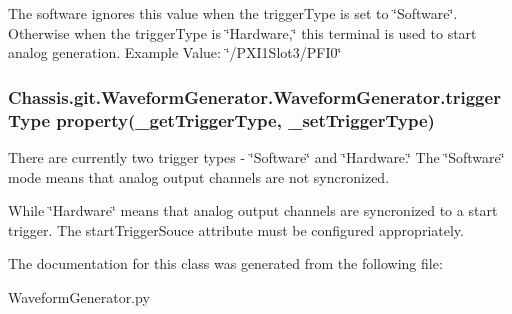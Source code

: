 The software ignores this value when the trigger\-Type is set to \char`\"{}\-Software\char`\"{}. Otherwise when the trigger\-Type is \char`\"{}\-Hardware,\char`\"{} this terminal is used to start analog generation. Example Value\-: \char`\"{}/\-P\-X\-I1\-Slot3/\-P\-F\-I0\char`\"{} \hypertarget{class_chassis_8git_1_1_waveform_generator_1_1_waveform_generator_a16967bab9c78a174def6dca01776065f}{
\subsubsection[{trigger\-Type}]{\setlength{\rightskip}{0pt plus 5cm}Chassis.\-git.\-Waveform\-Generator.\-Waveform\-Generator.\-trigger\-Type property(\-\_\-get\-Trigger\-Type, \-\_\-set\-Trigger\-Type)\hspace{0.3cm}{\ttfamily [static]}}}\label{class_chassis_8git_1_1_waveform_generator_1_1_waveform_generator_a16967bab9c78a174def6dca01776065f}


There are currently two trigger types -\/ \char`\"{}\-Software\char`\"{} and \char`\"{}\-Hardware.\char`\"{} The \char`\"{}\-Software\char`\"{} mode means that analog output channels are not syncronized. 

While \char`\"{}\-Hardware\char`\"{} means that analog output channels are syncronized to a start trigger. The start\-Trigger\-Souce attribute must be configured appropriately. 

The documentation for this class was generated from the following file\-:\begin{DoxyCompactItemize}
\item 
Waveform\-Generator.\-py\end{DoxyCompactItemize}
